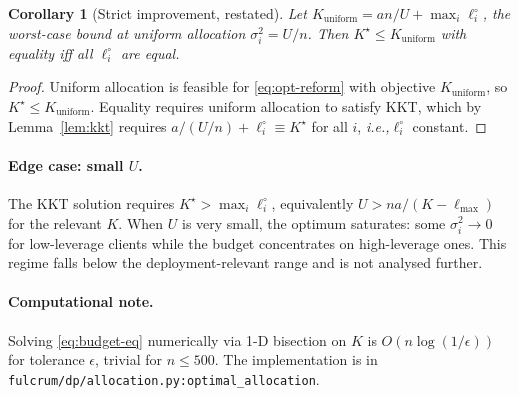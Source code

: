 \documentclass[letterpaper,journal]{IEEEtran}
\newtheorem{corollary}[theorem]{Corollary}
\newcommand{\ie}{\textit{i.e.,}\xspace}
\begin{document}
\begin{corollary}[Strict improvement, restated]
\label{cor:strict-restated}
Let $K_{\mathrm{uniform}} = an/U + \max_i \ell_i^\circ$, the worst-case
bound at uniform allocation $\sigma_i^2 = U/n$. Then
\(K^\star \leq K_{\mathrm{uniform}}\) with equality iff all
$\ell_i^\circ$ are equal.
\end{corollary}
\begin{proof}
Uniform allocation is feasible for \eqref{eq:opt-reform} with
objective $K_{\mathrm{uniform}}$, so $K^\star \leq K_{\mathrm{uniform}}$.
Equality requires uniform allocation to satisfy KKT, which by
Lemma~\ref{lem:kkt} requires
$a/(U/n) + \ell_i^\circ \equiv K^\star$ for all $i$, \ie $\ell_i^\circ$
constant.
\end{proof}

\paragraph{Edge case: small $U$.}
The KKT solution requires $K^\star > \max_i \ell_i^\circ$, equivalently
$U > n a/(K - \ell_{\max})$ for the relevant $K$. When $U$ is very
small, the optimum saturates: some $\sigma_i^2 \to 0$ for low-leverage
clients while the budget concentrates on high-leverage ones. This
regime falls below the deployment-relevant range and is not analysed
further.

\paragraph{Computational note.}
Solving \eqref{eq:budget-eq} numerically via 1-D bisection on $K$ is
$O(n \log(1/\epsilon))$ for tolerance $\epsilon$, trivial for $n \leq
500$. The implementation is in
\texttt{fulcrum/dp/allocation.py:optimal\_allocation}.
\end{document}
